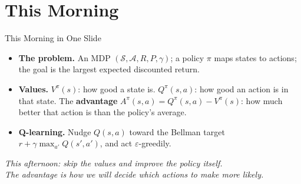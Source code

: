 \section{This Morning}
\begin{frame}{This Morning in One Slide}
\begin{itemize}\itemsep0.7em
    \item \textbf{The problem.} An MDP $(\mathcal{S}, \mathcal{A}, R, P, \gamma)$; a policy
          $\pi$ maps states to actions; the goal is the largest expected discounted return.
    \item \textbf{Values.} $V^{\pi}(s)$: how good a state is. $Q^{\pi}(s,a)$: how good an
          action is in that state. The \textbf{advantage}
          $A^{\pi}(s,a) = Q^{\pi}(s,a) - V^{\pi}(s)$: how much better that action is than
          the policy's average.
    \item \textbf{Q-learning.} Nudge $Q(s,a)$ toward the Bellman target
          $r + \gamma \max_{a'} Q(s',a')$, and act $\varepsilon$-greedily.
\end{itemize}
\vfill
\begin{center}
\itshape This afternoon: skip the values and improve the policy itself.\\
The advantage is how we will decide which actions to make more likely.
\end{center}
\end{frame}
